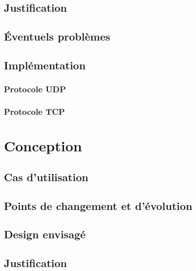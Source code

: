 \documentclass{report}
\begin{document}
	\section{Justification}
		 \label{justification}

	\section{Éventuels problèmes}
		 \label{problemes}
	
	\newpage
	\section{Implémentation}
		\subsection{Protocole UDP}
			 \label{udp}
		\subsection{Protocole TCP}
			 \label{tcp}
		

\chapter{Conception}
			
	\section{Cas d'utilisation}
			 \label{cas_utilisation}
			
	\section{Points de changement et d'évolution}
			 \label{changement}
			 \label{evolution}
			
	\section{Design envisagé}
			 \label{design}
			
	\section{Justification}
			 \label{justification}
			
\end{document}
